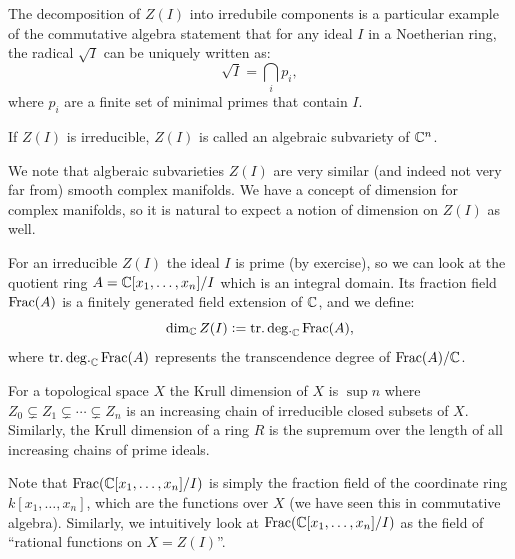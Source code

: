 \documentclass[11pt,a4paper]{article}
\begin{document}
\begin{remark}
  The decomposition of $Z(I)$ into irredubile components is a particular example
  of the commutative algebra statement that for any ideal $I$
  in a Noetherian ring, the radical $\sqrt{I}$ can be uniquely written as:
  \[
    \sqrt{I} = \bigcap_{i} p_i,
  \]
  where $p_i$ are a finite set of minimal primes that contain $I$.
\end{remark}

\begin{definition}
  If $Z(I)$ is irreducible, $Z(I)$ is called an algebraic subvariety of $\mathbb{C}^n$.
\end{definition}

\begin{remark}
  We note that algberaic subvarieties $Z(I)$ are very similar (and indeed
  not very far from) smooth complex manifolds.
  We have a concept of dimension for complex manifolds,
  so it is natural to expect a notion of dimension on $Z(I)$ as well.
\end{remark}

\begin{definition}
  For an irreducible $Z(I)$ the ideal $I$ is prime (by exercise),
  so we can look at the quotient ring $A = \mathbb{C}[x_1,\dots,x_n] / I$
  which is an integral domain.
  Its fraction field $\operatorname{Frac}(A)$ is a finitely generated field extension of $\mathbb{C}$,
  and we define:
  \[
    \dim_{\mathbb{C}} Z(I) := \operatorname{tr.deg.}_{\mathbb{C}} \operatorname{Frac}(A),
  \]
  where $\operatorname{tr.deg.}_{\mathbb{C}} \operatorname{Frac}(A)$
  represents the transcendence degree of $\operatorname{Frac}(A)/\mathbb{C}$.
\end{definition}

\begin{definition}
  For a topological space $X$ the Krull dimension of $X$ is $\sup n$ where
  $Z_0 \subsetneq Z_1 \subsetneq \cdots \subsetneq Z_n$
  is an increasing chain of irreducible closed subsets of $X$.
  Similarly, the Krull dimension of a ring $R$
  is the supremum over the length of all increasing
  chains of prime ideals.
\end{definition}

\begin{remark}
  Note that $\operatorname{Frac}(\mathbb{C}[x_1,\dots,x_n] / I)$ is simply the fraction field
  of the coordinate ring $k[x_1,\dots,x_n]$, which are the functions over $X$
  (we have seen this in commutative algebra).
  Similarly, we intuitively look at $\operatorname{Frac}(\mathbb{C}[x_1,\dots,x_n] / I)$
  as the field of ``rational functions on $X = Z(I)$''.
\end{remark}
\end{document}
